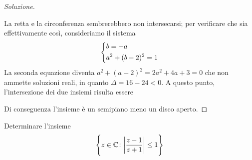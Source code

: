 \begin{proof}[Soluzione]
\begin{center}
    \end{center}
    La retta e la circonferenza sembrerebbero non intersecarsi; per verificare che sia effettivamente così, consideriamo il sistema
    \[
    \begin{dcases}
        b=-a\\
        a^2+(b-2)^2 = 1
    \end{dcases}
    \]
    La seconda equazione diventa $a^2+(a+2)^2 = 2a^2 +4a+3=0$ che non ammette soluzioni reali, in quanto $\Delta = 16-24<0$. A questo punto, l'intersezione dei due insiemi risulta essere
    \begin{center}
    \end{center}
    Di conseguenza l'insieme è un semipiano meno un disco aperto.
\end{proof}
\begin{exercise}
    \label{ex:3.7}
    Determinare l'insieme
    \[
    \left\{z\in\amsbb{C}\colon \abs{\frac{z-1}{z+1}}\le 1\right\}
    \]
\end{exercise}
